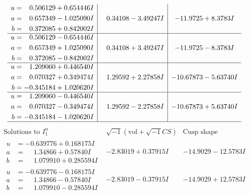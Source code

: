 \documentclass[1p]{elsarticle_modified}
\theoremstyle{definition}
\newcommand{\I}{\sqrt{-1}}
\begin{document}
$$\begin{array}{c|c|c}
\begin{aligned}
u &= \phantom{-}0.506129 + 0.654446 I \\
a &= \phantom{-}0.657349 - 1.025090 I \\
b &= \phantom{-}0.372085 + 0.842002 I\end{aligned}
 & \phantom{-}0.34108 - 3.49247 I & -11.9725 + 8.3783 I \\ \hline\begin{aligned}
u &= \phantom{-}0.506129 - 0.654446 I \\
a &= \phantom{-}0.657349 + 1.025090 I \\
b &= \phantom{-}0.372085 - 0.842002 I\end{aligned}
 & \phantom{-}0.34108 + 3.49247 I & -11.9725 - 8.3783 I \\ \hline\begin{aligned}
u &= \phantom{-}1.209060 + 0.446540 I \\
a &= \phantom{-}0.070327 + 0.349474 I \\
b &= -0.345184 + 1.020620 I\end{aligned}
 & \phantom{-}1.29592 + 2.27858 I & -10.67873 - 5.63740 I \\ \hline\begin{aligned}
u &= \phantom{-}1.209060 - 0.446540 I \\
a &= \phantom{-}0.070327 - 0.349474 I \\
b &= -0.345184 - 1.020620 I\end{aligned}
 & \phantom{-}1.29592 - 2.27858 I & -10.67873 + 5.63740 I\\
 \hline 
 \end{array}$$\newpage$$\begin{array}{c|c|c}  
\text{Solutions to }I^u_{1}& \I (\text{vol} + \sqrt{-1}CS) & \text{Cusp shape}\\
 \hline 
\begin{aligned}
u &= -0.639776 + 0.168175 I \\
a &= \phantom{-}1.34866 + 0.57840 I \\
b &= \phantom{-}1.079910 + 0.285594 I\end{aligned}
 & -2.83019 + 0.37915 I & -14.9029 - 12.5783 I \\ \hline\begin{aligned}
u &= -0.639776 - 0.168175 I \\
a &= \phantom{-}1.34866 - 0.57840 I \\
b &= \phantom{-}1.079910 - 0.285594 I\end{aligned}
 & -2.83019 - 0.37915 I & -14.9029 + 12.5783 I \\ \hline\begin{aligned}

\end{aligned}
\end{array}$$
\end{document}
